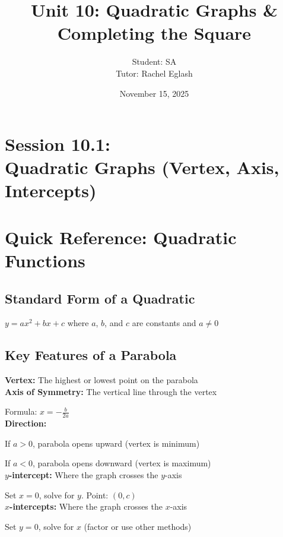\documentclass[12pt]{article}
\title{Unit 10: Quadratic Graphs \& Completing the Square}
\author{
	Student: SA\\
	Tutor: Rachel Eglash}
\date{November 15, 2025}
\begin{document}
	
	\maketitle
    
    \newpage

	\section*{Session 10.1: \\ Quadratic Graphs (Vertex, Axis, Intercepts)}

	\section*{Quick Reference: Quadratic Functions}

		\subsection*{Standard Form of a Quadratic}

			$y = ax^2 + bx + c$  where $a$, $b$, and $c$ are constants and $a \neq 0$

		\subsection*{Key Features of a Parabola}

			\textbf{Vertex:} The highest or lowest point on the parabola\\

			\textbf{Axis of Symmetry:} The vertical line through the vertex
            
            Formula: $x = -\frac{b}{2a}$\\

			\textbf{Direction:}
            
            If $a > 0$, parabola opens upward (vertex is minimum)

            If $a < 0$, parabola opens downward (vertex is maximum)\\

			\textbf{$y$-intercept:} Where the graph crosses the $y$-axis
            
            Set $x = 0$, solve for $y$. Point: $(0, c)$\\

			\textbf{$x$-intercepts:} Where the graph crosses the $x$-axis
            
            Set $y = 0$, solve for $x$ (factor or use other methods)
\end{document}
